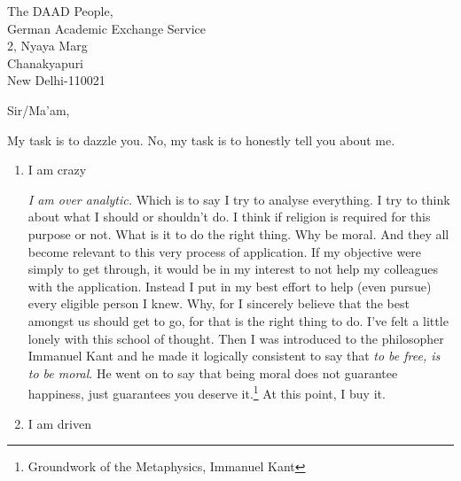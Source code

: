 \documentclass{letter}
\begin{document}

\begin{letter}{The DAAD People,\\German Academic Exchange Service\\2, Nyaya Marg\\Chanakyapuri\\New Delhi-110021} %


\opening{Sir/Ma'am,}

My task is to dazzle you. No, my task is to honestly tell you about me. 

\begin{enumerate}
\item I am crazy

\emph{I am over analytic.} Which is to say I try to analyse everything. I try to think about what I should or shouldn't do. I think if religion is required for this purpose or not. What is it to do the right thing. Why be moral. And they all become relevant to this very process of application. If my objective were simply to get through, it would be in my interest to not help my colleagues with the application. Instead I put in my best effort to help (even pursue) every eligible person I knew. Why, for I sincerely believe that the best amongst us should get to go, for that is the right thing to do. I've felt a little lonely with this school of thought. Then I was introduced to the philosopher Immanuel Kant and he made it logically consistent to say that \emph{to be free, is to be moral}. He went on to say that being moral does not guarantee happiness, just guarantees you deserve it.\footnote{Groundwork of the Metaphysics, Immanuel Kant} At this point, I buy it.

\item I am driven


\end{enumerate}
\end{letter}
\end{document}
